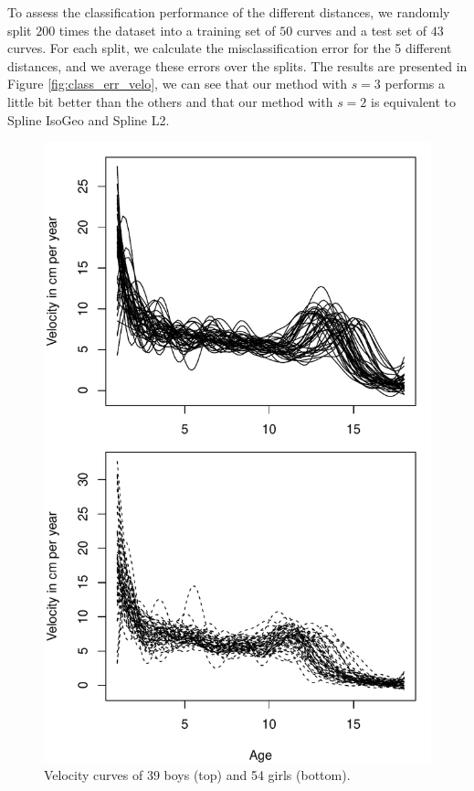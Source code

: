 To assess the classification performance of the different distances, we randomly split $200$ times the dataset into a training set of $50$ curves and a test set of $43$ curves. For each split, we calculate the misclassification error for the 5 different distances, and we average these errors over the splits. The results are presented in Figure \ref{fig:class_err_velo}, we can see that our method with $s=3$ performs a little bit better than the others and that our method with $s=2$ is equivalent to Spline IsoGeo and Spline L2.

\begin{figure}
\centering
\includegraphics[height=0.55\textheight]{./Velocity_curves_data_illustration.pdf}
\caption{Velocity curves of 39 boys (top) and 54 girls (bottom).}
\label{fig:data_illu}
\end{figure}

